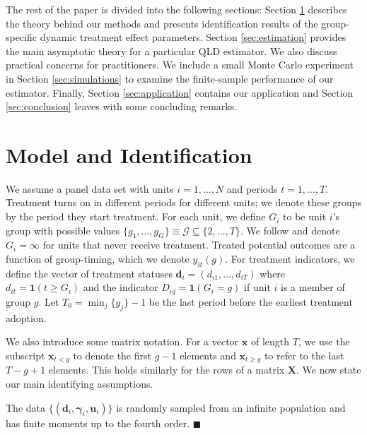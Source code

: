 \documentclass[12pt]{article}
\begin{document}
The rest of the paper is divided into the following sections: Section \ref{sec:theory} describes the theory behind our methods and presents identification results of the group-specific dynamic treatment effect parameters. Section \ref{sec:estimation} provides the main asymptotic theory for a particular QLD estimator. We also discuss practical concerns for practitioners. We include a small Monte Carlo experiment in Section \ref{sec:simulations} to examine the finite-sample performance of our estimator. Finally, Section \ref{sec:application} contains our application and Section \ref{sec:conclusion} leaves with some concluding remarks. 


\section{Model and Identification} \label{sec:theory}

We assume a panel data set with units $i = 1,\dots, N$ and periods $t = 1, \dots, T$. Treatment turns on in different periods for different units; we denote these groups by the period they start treatment. For each unit, we define $G_i$ to be unit $i$'s group with possible values $\{ g_1, \dots, g_G \} \equiv \mathcal{G} \subseteq \{ 2, \dots, T \}$. We follow \citet{Callaway_Santanna_2021} and denote $G_i = \infty$ for units that never receive treatment. Treated potential outcomes are a function of group-timing, which we denote $y_{it}(g)$. For treatment indicators, we define the vector of treatment statuses $\bm d_{i} = (d_{i1},...,d_{iT})$ where $d_{it} = \mathbf{1}(t \geq G_i)$ and the indicator $D_{ig} = \mathbf{1}(G_i = g)$ if unit $i$ is a member of group $g$. Let $T_0 = \min_j \{ g_j \} - 1$ be the last period before the earliest treatment adoption. 

We also introduce some matrix notation. For a vector $\bm x$ of length $T$, we use the subscript $\bm x_{t < g}$ to denote the first $g - 1$ elements and $\bm x_{t \geq g}$ to refer to the last $T - g + 1$ elements. This holds similarly for the rows of a matrix $\bm X$. We now state our main identifying assumptions.

\begin{assumption}\label{asm:sampling}
The data $\{ (\bm d_i, \bm \gamma_i, \bm u_i) \}$ is randomly sampled from an infinite population and has finite moments up to the fourth order. $\blacksquare$
\end{assumption}
\end{document}
